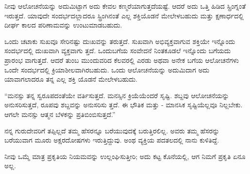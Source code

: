 ನೀವು ಆಲೋಚನೆಯನ್ನು ಅದುಮಿಟ್ಟಾಗ ಅದು ಕೇವಲ ಕಣ್ಮರೆಯಾಗುತ್ತದೆಯಷ್ಟೆ. ಆದರೆ ಅದು ಒತ್ತಿ ಹಿಡಿದ ಸ್ಪ್ರಿಂಗ್ನಂತೆ ಇರುತ್ತದೆ. ಯಾವುದೇ ಸಂದರ್ಭದಲ್ಲಾದರೂ ಸ್ಟ್ರಿಂಗಿನಂತೆ ಎಲ್ಲ ಶಕ್ತಿಯೊಡನೆ ಮೇಲೇಳಬಹುದು ಮತ್ತು ಕ್ಷಣಾರ್ಧದಲ್ಲಿ ದೀರ್ಘ ಕಾಲದ ಪರಿಣಾಮವನ್ನು ಉಂಟುಮಾಡಬಹುದು.

ಒಂದು ಚಟಾಕು ಸುಖವೂ ಸೇರಿನಷ್ಟು ದುಃಖವನ್ನು ತರುತ್ತದೆ. ಸುಖವಾಗಿ ಅಭಿವ್ಯಕ್ತವಾಗುವ ಶಕ್ತಿಯೇ ಇನ್ನೊಂದು ಸಂದರ್ಭದಲ್ಲಿ ದುಃಖವಾಗಿ ವ್ಯಕ್ತವಾಗು ತ್ತದೆ. ಒಂದುಬಗೆಯ ಸಂವೇದನೆ ನಿಂತಕೂಡಲೆ ಇನ್ನೊಂದು ಬಗೆಯದು ಪ್ರಾರಂಭ ವಾಗುತ್ತದೆ. ಆದರೆ ತುಂಬ ಮುಂದುವರಿದ ಕೆಲವರಲ್ಲಿ ಎರಡು ಅಥವಾ ಅನೇಕ ಬಗೆಯ ಆಲೋಚನೆಗಳು ಒಂದೇ ಸಂದರ್ಭದಲ್ಲಿ ಕ್ರಿಯಾಶೀಲವಾಗಿರಬಹುದು. ಒಂದು ಆಲೋಚನೆಯನ್ನು ಅದುಮಿದಾಗ ಅದು ಯಾವಾಗಲಾದರೂ ತನ್ನ ಎಲ್ಲ ಶಕ್ತಿ ಯೊಡನೆ ಮೇಲೇಳಬಹುದು.

“ಮನಸ್ಸು ತನ್ನ ಸ್ವರೂಪದಂತೆಯೇ ವರ್ತಿಸುತ್ತದೆ. ಮನಸ್ಸಿನ ಕ್ರಿಯೆಯೆಂದರೆ ಸೃಷ್ಟಿ. ಶಬ್ದವು ಆಲೋಚನೆಯನ್ನು ಅನುಸರಿಸುತ್ತದೆ, ರೂಪವು ಶಬ್ದವನ್ನು ಅನುಸರಿಸು ತ್ತದೆ. ಈ ಭೌತಿಕ ಮತ್ತು - ಮಾನಸಿಕ ಸೃಷ್ಟಿಯೆಲ್ಲವೂ ನಿಲ್ಲಬೇಕು. ಆಗಲೇ ಮನಸ್ಸು ಆತ್ಮನ ಬೆಳಕನ್ನು ಪ್ರತಿಬಿಂಬಿಸುತ್ತದೆ.”

ನನ್ನ ಗುರುದೇವರಿಗೆ ತಪ್ಪಿಲ್ಲದೆ ತಮ್ಮ ಹೆಸರನ್ನೂ ಬರೆಯುವುದಕ್ಕೆ ಬರುತ್ತಿರಲಿಲ್ಲ. ಅವರು ತಮ್ಮ ಹೆಸರನ್ನು ಬರೆಯುವಾಗ ಮೂರು ಅಕ್ಷರದೋಷಗಳು ಇರುತ್ತಿದ್ದುವು. ಅಂಥ ವ್ಯಕ್ತಿಯ ಪದತಲದಲ್ಲಿ ನಾನು ಕುಳಿತಿದ್ದೆ.

ನೀವು ಒಮ್ಮೆ ಮಾತ್ರ ಪ್ರಕೃತಿಯ ನಿಯಮವನ್ನು ಉಲ್ಲಂಘಿಸುತ್ತೀರಿ; ಅದು ಕಟ್ಟ ಕೊನೆಯಲ್ಲಿ, ಆಗ ನಿಮಗೆ ಪ್ರಕೃತಿ ಏನೂ ಅಲ್ಲ.

